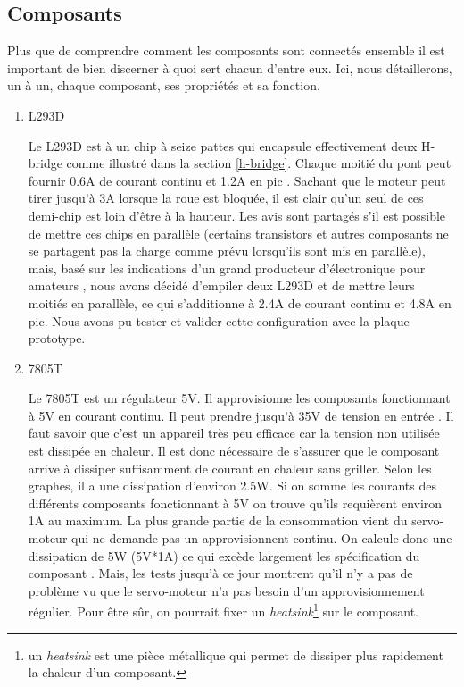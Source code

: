 \documentclass[a4paper,11pt]{report}
\begin{document}
{\subsection{Composants}

Plus que de comprendre comment les composants sont connectés ensemble il est important de bien discerner à quoi sert chacun d'entre eux. Ici, nous détaillerons, un à un, chaque composant, ses propriétés et sa fonction.


\begin{enumerate}
\item L293D

Le L293D est à un chip à seize pattes qui encapsule effectivement deux H-bridge comme illustré dans la section \ref{h-bridge}. Chaque moitié du pont peut fournir 0.6A de courant continu et 1.2A en pic \cite{l293dDataSheet}. Sachant que le moteur peut tirer jusqu'à 3A lorsque la roue est bloquée, il est clair qu'un seul de ces demi-chip est loin d'être à la hauteur. Les avis sont partagés s'il est possible de mettre ces chips en parallèle (certains transistors et autres composants ne se partagent pas la charge comme prévu lorsqu'ils sont mis en parallèle), mais, basé sur les indications d'un grand producteur d'électronique pour amateurs \cite{adafruitMotorShield}, nous avons décidé d'empiler deux L293D et de mettre leurs moitiés en parallèle, ce qui s'additionne à 2.4A de courant continu et 4.8A en pic. Nous avons pu tester et valider cette configuration avec la plaque prototype. 

\item 7805T

Le 7805T est un régulateur 5V. Il approvisionne les composants fonctionnant à 5V en courant continu. Il peut prendre jusqu'à 35V de tension en entrée \cite{7805T}. Il faut savoir que c'est un appareil très peu efficace car la tension non utilisée est dissipée en chaleur. Il est donc nécessaire de s'assurer que le composant arrive à dissiper suffisamment de courant en chaleur sans griller. Selon les graphes, il a une dissipation d'environ 2.5W. Si on somme les courants des différents composants fonctionnant à 5V on trouve qu'ils requièrent environ 1A au maximum. La plus grande partie de la consommation vient du servo-moteur qui ne demande pas un approvisionnent continu. On calcule donc une dissipation de 5W (5V*1A) ce qui excède largement les spécification du composant \cite{7805T}. Mais, les tests jusqu'à ce jour montrent qu'il n'y a pas de problème vu que le servo-moteur n'a pas besoin d'un approvisionnement régulier. Pour être sûr, on pourrait fixer un \textit{heatsink}\footnote{un \textit{heatsink} est une pièce métallique qui permet de dissiper plus rapidement la chaleur d'un composant.} sur le composant.


\end{enumerate}}
\end{document}
